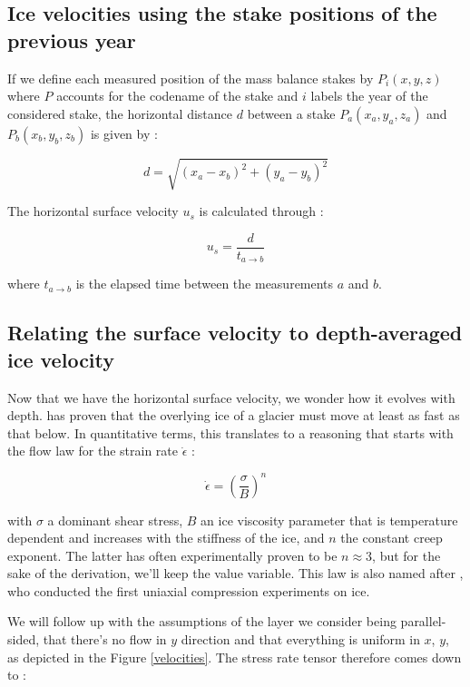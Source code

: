 \subsection*{Ice velocities using the stake positions of the previous year}

If we define each measured position of the mass balance stakes by $P_i(x,y,z)$ where $P$ accounts for the codename of the stake and $i$ labels the year of the considered stake, the horizontal distance $d$ between a stake $P_a(x_a, y_a, z_a)$ and $P_b(x_b, y_b, z_b)$ is given by :

\begin{equation}d = \sqrt{(x_a - x_b)^2 + (y_a - y_b)^2}\end{equation}

The horizontal surface velocity $u_s$ is calculated through :

\begin{equation}
\boxed{u_s = \frac{d}{t_{a \rightarrow b}}}
\end{equation}

where $t_{a \rightarrow b}$ is the elapsed time between the measurements $a$ and $b$.


\subsection*{Relating the surface velocity to depth-averaged ice velocity}

Now that we have the horizontal surface velocity, we wonder how it evolves with depth. \cite{Nye1952} has proven that the overlying ice of a glacier must move at least as fast as that below. In quantitative terms, this translates to a reasoning that starts with the flow law for the strain rate $\dot{\epsilon}$ :

\begin{equation}\dot{\epsilon} = \left( \frac{\sigma}{B} \right)^n\end{equation}

with $\sigma$ a dominant shear stress, $B$ an ice viscosity parameter that is temperature dependent and increases with the stiffness of the ice, and $n$ the constant creep exponent. The latter has often experimentally proven to be $n \approx 3$, but for the sake of the derivation, we'll keep the value variable.
This law is also named after \cite{Glen1955}, who conducted the first uniaxial compression experiments on ice.

We will follow up with the assumptions of the layer we consider being parallel-sided, that there's no flow in $y$ direction and that everything is uniform in $x$, $y$, as depicted in the Figure \ref{velocities}. The stress rate tensor therefore comes down to :


